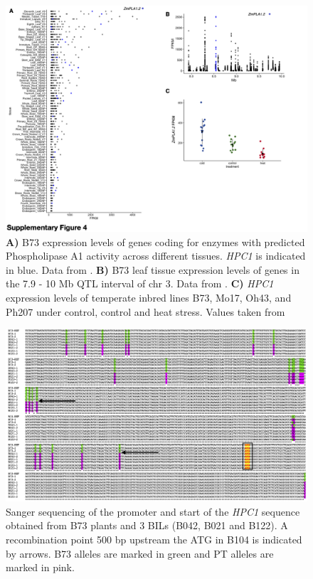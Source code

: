 \documentclass[9pt,twocolumn,twoside,lineno]{BioRxiv}
\begin{document}
\clearpage

\begin{figure}[t]
\begin{center}
\includegraphics[width=0.4\paperwidth]{Sup_Figures/Sup_Fig_4.png}
\caption{\textbf{A)} B73 expression levels of genes coding for enzymes with predicted Phospholipase A1 activity across different tissues. \textit{HPC1} is indicated in blue. 
Data from \cite{Stelpflug2016-vr}.
\textbf{B)} B73 leaf tissue expression levels of genes in the 7.9 - 10 Mb QTL interval of chr 3. 
Data from \cite{Stelpflug2016-vr}.
\textbf{C)} \textit{HPC1} expression levels of temperate inbred lines B73, Mo17, Oh43, and Ph207 under control, control and heat stress. Values taken from \cite{Waters2017-nat}
} 
\label{SupFig3}
\end{center}
\end{figure}  

\clearpage


\begin{figure}[t]
\begin{center}
\includegraphics[width=0.9 \paperwidth]{Sup_Figures/Sup_Fig_5.png}
\caption{Sanger sequencing of the promoter and start of the \textit{HPC1} sequence obtained from B73 plants and 3 BILs (B042, B021 and B122). A recombination point 500 bp upstream the ATG in B104 is indicated by arrows. B73 alleles are marked in green and PT alleles are marked in pink. 
}
\label{SupFig4}
\end{center}
\end{figure} 
\end{document}
